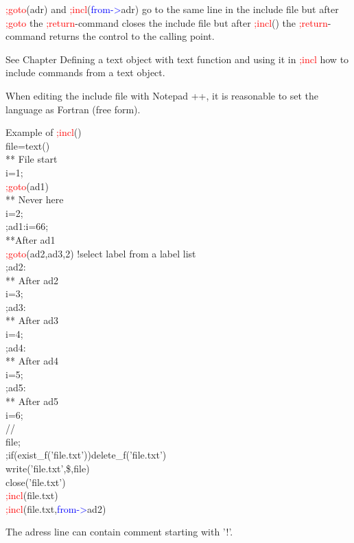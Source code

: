 \begin{note}
\textcolor{Red}{;goto}(adr) and \textcolor{Red}{;incl}(\textcolor{blue}{from->}adr) go to the same line in the include file but after \textcolor{Red}{;goto} the \textcolor{Red}{;return}-command
closes the include file but after \textcolor{Red}{;incl}() the \textcolor{Red}{;return}-command returns the control to the calling point.
\end{note}
\begin{note}
See Chapter Defining a text object with text function and using it in \textcolor{Red}{;incl} how to include
commands from a text object.
\end{note}
\begin{note}
When editing the include file with Notepad ++, it is reasonable to set the language as Fortran (free form).
\end{note}
\begin{example}[inpuincl]Example of \textcolor{Red}{;incl}()\\
\label{inpuincl}
file=\textcolor{VioletRed}{text}()\\
** File start\\
i=1;\\
\textcolor{Red}{;goto}(ad1)\\
** Never here\\
i=2;\\
;ad1:i=66;\\
**After ad1\\
\textcolor{Red}{;goto}(ad2,ad3,2)  !select label from a label list\\
;ad2:\\
** After ad2\\
i=3;\\
;ad3:\\
** After ad3\\
i=4;\\
;ad4:\\
** After ad4\\
i=5;\\
;ad5:\\
** After ad5\\
i=6;\\
//\\
file;\\
;if(\textcolor{VioletRed}{exist\_f}('file.txt'))\textcolor{VioletRed}{delete\_f}('file.txt')\\
\textcolor{VioletRed}{write}('file.txt',\$,file)\\
\textcolor{VioletRed}{close}('file.txt')\\
\textcolor{Red}{;incl}(file.txt)\\
\textcolor{Red}{;incl}(file.txt,\textcolor{blue}{from->}ad2)
\end{example}
\begin{note}
The adress line can contain comment starting with '!'.
\end{note}
